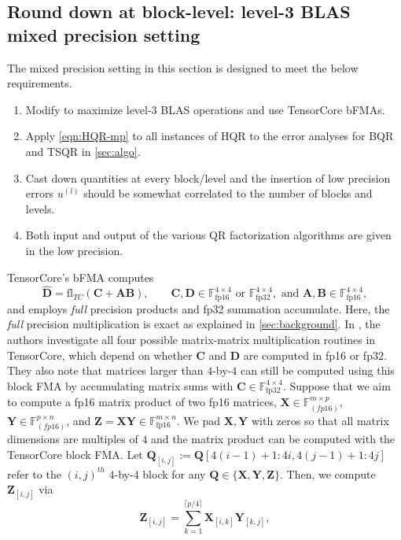 \documentclass[review,onefignum,onetabnum]{siamart190516}
\newcommand{\F}{\mathbb{F}}
\newcommand{\bb}[1]{\mathbf{#1}}
\newcommand{\fl}{\mathrm{fl}}
\begin{document}
\subsection{Round down at block-level: level-3 BLAS mixed precision setting}\label{sec:mp-3}
The mixed precision setting in this section is designed to meet the below requirements.
\begin{enumerate}
	\item Modify  to maximize level-3 BLAS operations and use TensorCore bFMAs. 
	\item Apply \cref{eqn:HQR-mp} to all instances of HQR to the error analyses for BQR and TSQR in \cref{sec:algo}.
	\item Cast down quantities at every block/level and the insertion of low precision errors $u^{(l)}$ should be somewhat correlated to the number of blocks and levels. 
	\item Both input and output of the various QR factorization algorithms are given in the low precision. 
\end{enumerate}
TensorCore's bFMA computes 
\begin{equation}
\hat{\bb{D}} =\fl_{TC}(\bb{C} + \bb{A}\bb{B}),\qquad \bb{C},\bb{D}\in\F_{\text{fp16}}^{4\times 4}\text{ or }\F_{\text{fp32}}^{4\times 4},\text{ and } \bb{A},\bb{B}\in\F_{\text{fp16}}^{4\times 4},\label{eqn:bFMA}
\end{equation}
and employs \emph{full} precision products and fp32 summation accumulate.
Here, the \emph{full} precision multiplication is exact as explained in \cref{sec:background}.
In \cite{Blanchard2019}, the authors investigate all four possible matrix-matrix multiplication routines in TensorCore, which depend on whether $\bb{C}$ and $\bb{D}$ are computed in fp16 or fp32. 
They also note that matrices larger than $4$-by-$4$ can still be computed using this block FMA by accumulating matrix sums with $\bb{C}\in\F_{\text{fp32}}^{4\times 4}$.
Suppose that we aim to compute a fp16 matrix product of two fp16 matrices, $\bb{X}\in\F_{(fp16)}^{m\times p}$, $\bb{Y}\in\F_{(fp16)}^{p\times n}$, and $\bb{Z}=\bb{XY}\in\F_{\text{fp16}}^{m\times n}$.
We pad $\bb{X},\bb{Y}$ with zeros so that all matrix dimensions are multiples of $4$ and the matrix product can be computed with the TensorCore block FMA.
Let $\bb{Q}_{[i,j]}:= \bb{Q}[4(i-1)+1:4i,4(j-1)+1:4j]$ refer to the $(i,j)^{th}$ $4$-by-$4$ block for any $\bb{Q}\in\{\bb{X},\bb{Y},\bb{Z}\}$.
Then, we compute $\bb{Z}_{[i,j]}$ via \[
\bb{Z}_{[i,j]} = \sum_{k=1}^{\lceil p/4\rceil} \bb{X}_{[i,k]} \bb{Y}_{[k,j]},
\]
\end{document}

